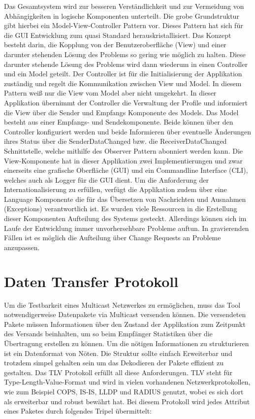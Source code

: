 Das Gesamtsystem wird zur besseren Verständlichkeit und zur Vermeidung von Abhängigkeiten 
in logische Komponenten unterteilt. Die grobe Grundstruktur gibt hierbei ein Model-View-Controller
Pattern vor. Dieses Pattern hat sich für die GUI Entwicklung zum quasi Standard herauskristallisiert. 
Das Konzept besteht darin, die Kopplung von der Benutzeroberfläche (View) und einer darunter stehenden Lösung des 
Problems so gering wie möglich zu halten. Diese darunter stehende Lösung des Problems wird dann wiederum in 
einen Controller und ein Model geteilt. Der Controller ist für die Initialisierung der Applikation zuständig und regelt die Kommunikation zwischen View und Model. 
In diesem Pattern weiß nur die View vom Model aber nicht umgekehrt. 
In dieser Applikation übernimmt der Controller die Verwaltung der Profile und informiert die View über die Sender und Empfangs
Komponente des Models. Das Model besteht aus einer Empfangs- und Sendekomponente. Beide können über den Controller
konfiguriert werden und beide Informieren über eventuelle Änderungen ihres Status über die SenderDataChanged
bzw. die ReceiverDataChanged Schnittstelle, welche mithilfe des Observer Pattern abonniert werden kann.
Die View-Komponente hat in dieser Applikation zwei Implementierungen und zwar
einerseits eine grafische Oberfläche (GUI) und ein Commandline Interface (CLI),
welches auch als Logger für die GUI dient. Um die Anforderung der Internationalisierung zu erfüllen, verfügt die Applikation zudem über eine Language
Komponente die für das Übersetzen von Nachrichten und Ausnahmen (Exceptions) verantwortlich ist.
Es wurden viele Ressourcen in die Erstellung dieser Komponenten Aufteilung des Systems gesteckt. 
Allerdings können sich im Laufe der Entwicklung immer unvorhersehbare Probleme auftun. In gravierenden Fällen
ist es möglich die Aufteilung über Change Requests an Probleme anzupassen.

\section{Daten Transfer Protokoll}
\label{sec:usec}

Um die Testbarkeit eines Multicast Netzwerkes zu ermöglichen, muss das Tool notwendigerweise
Datenpakete via Multicast versenden können. Die versendeten Pakete müssen Informationen über den
Zustand der Applikation zum Zeitpunkt des Versands beinhalten, um so beim Empfänger
Statistiken über die Übertragung erstellen zu können. Um die nötigen Informationen
zu strukturieren ist ein Datenformat von Nöten. Die Struktur sollte einfach
Erweiterbar und trotzdem simpel gehalten sein um das Dekodieren der Pakete 
effizient zu gestalten. Das TLV Protokoll erfüllt all diese Anforderungen.
TLV steht für Type-Length-Value-Format und wird in vielen vorhandenen 
Netzwerkprotokollen, wie zum Beispiel COPS, IS-IS, LLDP und RADIUS genutzt,
wobei es sich dort als erweiterbar und robust bewährt hat.
Bei diesem Protokoll wird jedes Attribut eines Paketes durch folgendes Tripel übermittelt:

